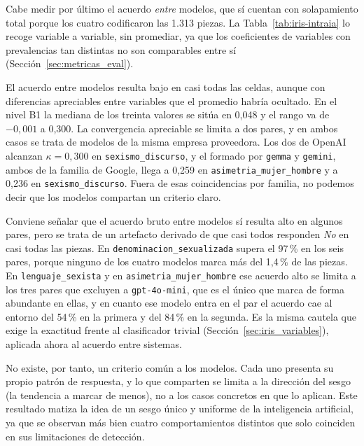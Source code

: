 Cabe medir por último el acuerdo \emph{entre} modelos, que sí cuentan con solapamiento
total porque los cuatro codificaron las 1.313 piezas. La
Tabla~\ref{tab:iris-intraia} lo recoge variable a variable, sin promediar, ya que
los coeficientes de variables con prevalencias tan distintas no son comparables
entre sí (Sección~\ref{sec:metricas_eval}).



El acuerdo entre modelos resulta bajo en casi todas las celdas, aunque con
diferencias apreciables entre variables que el promedio habría ocultado. En el
nivel B1 la mediana de los treinta valores se sitúa en 0,048 y el rango va de
$-0,001$ a 0,300. La convergencia apreciable se limita a dos pares, y en ambos casos
se trata de modelos de la misma empresa proveedora. Los dos de OpenAI alcanzan
$\kappa = 0,300$ en \texttt{sexismo\_discurso}, y el formado por \texttt{gemma} y
\texttt{gemini}, ambos de la familia de Google, llega a 0,259 en
\texttt{asimetria\_mujer\_hombre} y a 0,236 en \texttt{sexismo\_discurso}. Fuera de
esas coincidencias por familia, no podemos decir que los modelos compartan un criterio claro.

Conviene señalar que el acuerdo bruto entre modelos sí resulta alto en algunos
pares, pero se trata de un artefacto derivado de que casi todos responden \textit{No} en casi
todas las piezas. En \texttt{denominacion\_sexualizada} supera el 97\,\% en los seis
pares, porque ninguno de los cuatro modelos marca más del 1,4\,\% de las piezas. En
\texttt{lenguaje\_sexista} y en \texttt{asimetria\_mujer\_hombre} ese acuerdo alto se
limita a los tres pares que excluyen a \texttt{gpt-4o-mini}, que es el único que
marca de forma abundante en ellas, y en cuanto ese modelo entra en el par el acuerdo
cae al entorno del 54\,\% en la primera y del 84\,\% en la segunda. Es la misma
cautela que exige la exactitud frente al clasificador trivial
(Sección~\ref{sec:iris_variables}), aplicada ahora al acuerdo entre sistemas.

No existe, por tanto, un criterio común a los modelos. Cada uno presenta su propio
patrón de respuesta, y lo que comparten se limita a la dirección del sesgo (la
tendencia a marcar de menos), no a los casos concretos en que lo aplican. Este
resultado matiza la idea de un sesgo único y uniforme de la inteligencia artificial,
ya que se observan más bien cuatro comportamientos distintos que solo coinciden en
sus limitaciones de detección.

